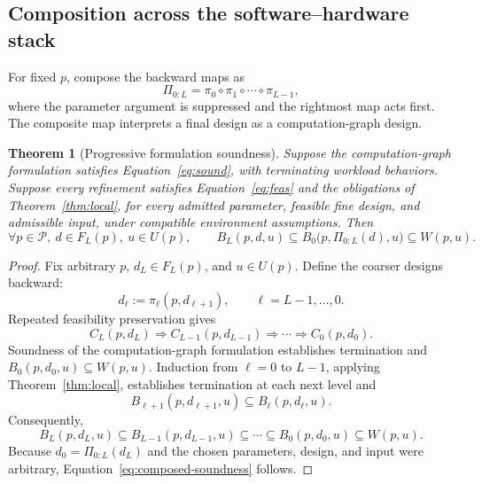 \documentclass[11pt]{article}
\newtheorem{theorem}{Theorem}
\begin{document}
\subsection{Composition across the software--hardware stack}
For fixed $p$, compose the backward maps as
\begin{equation}
 \Pi_{0:L}=\pi_0\circ\pi_1\circ\cdots\circ\pi_{L-1},
 \label{eq:map-composition}
\end{equation}
where the parameter argument is suppressed and the rightmost map acts first. The composite map interprets a final design as a computation-graph design.

\begin{theorem}[Progressive formulation soundness]\label{thm:composition}
Suppose the computation-graph formulation satisfies Equation~\ref{eq:sound}, with terminating workload behaviors. Suppose every refinement satisfies Equation~\ref{eq:feas} and the obligations of Theorem~\ref{thm:local}, for every admitted parameter, feasible fine design, and admissible input, under compatible environment assumptions. Then
\begin{equation}
 \forall p\in\mathcal P,\ d\in F_L(p),\ u\in U(p),\qquad
 B_L(p,d,u)\subseteq B_0\bigl(p,\Pi_{0:L}(d),u\bigr)\subseteq W(p,u).
 \label{eq:composed-soundness}
\end{equation}
\end{theorem}
\begin{proof}
Fix arbitrary $p$, $d_L\in F_L(p)$, and $u\in U(p)$. Define the coarser designs backward:
\begin{equation}
 d_\ell:=\pi_\ell(p,d_{\ell+1}),\qquad \ell=L-1,\ldots,0.
\end{equation}
Repeated feasibility preservation gives
\begin{equation}
 C_L(p,d_L)\Longrightarrow C_{L-1}(p,d_{L-1})
 \Longrightarrow\cdots\Longrightarrow C_0(p,d_0).
\end{equation}
Soundness of the computation-graph formulation establishes termination and $B_0(p,d_0,u)\subseteq W(p,u)$. Induction from $\ell=0$ to $L-1$, applying Theorem~\ref{thm:local}, establishes termination at each next level and
\begin{equation}
 B_{\ell+1}(p,d_{\ell+1},u)\subseteq B_\ell(p,d_\ell,u).
\end{equation}
Consequently,
\begin{equation}
 B_L(p,d_L,u)\subseteq B_{L-1}(p,d_{L-1},u)
 \subseteq\cdots\subseteq B_0(p,d_0,u)\subseteq W(p,u).
\end{equation}
Because $d_0=\Pi_{0:L}(d_L)$ and the chosen parameters, design, and input were arbitrary, Equation~\ref{eq:composed-soundness} follows.
\end{proof}
\end{document}
